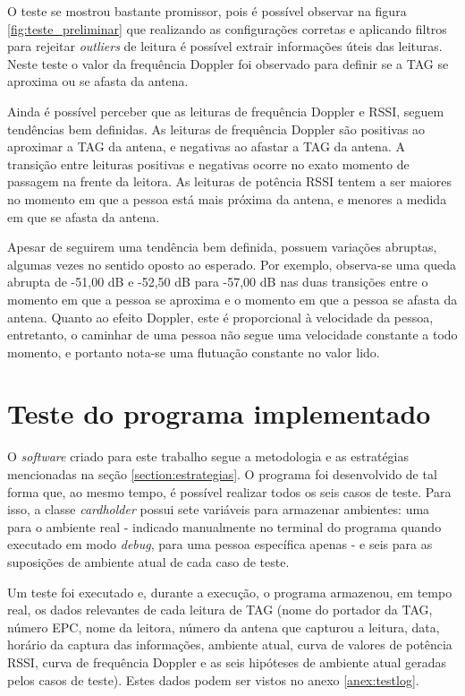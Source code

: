  O teste se mostrou bastante promissor, pois é possível observar na figura \ref{fig:teste_preliminar} que realizando as configurações corretas e aplicando filtros para rejeitar \textit{outliers} de leitura é possível extrair informações úteis das leituras. Neste teste o valor da frequência Doppler foi observado para definir se a TAG se aproxima ou se afasta da antena.
 
 Ainda é possível perceber que as leituras de frequência Doppler e RSSI, seguem tendências bem definidas. As leituras de frequência Doppler são positivas ao aproximar a TAG da antena, e negativas ao afastar a TAG da antena. A transição entre leituras positivas e negativas ocorre no exato momento de passagem na frente da leitora. As leituras de potência RSSI tentem a ser maiores no momento em que a pessoa está mais próxima da antena, e menores a medida em que se afasta da antena.
 
 Apesar de seguirem uma tendência bem definida, possuem variações abruptas, algumas vezes no sentido oposto ao esperado. Por exemplo, observa-se uma queda abrupta de -51,00 dB e -52,50 dB para -57,00 dB nas duas transições entre o momento em que a pessoa se aproxima e o momento em que a pessoa se afasta da antena. Quanto ao efeito Doppler, este é proporcional à velocidade da pessoa, entretanto, o caminhar de uma pessoa não segue uma velocidade constante a todo momento, e portanto nota-se uma flutuação constante no valor lido.

\section{Teste do programa implementado}

O \textit{software} criado para este trabalho segue a metodologia e as estratégias mencionadas na seção \ref{section:estrategias}. O programa foi desenvolvido de tal forma que, ao mesmo tempo, é possível realizar todos os seis casos de teste. Para isso, a classe \textit{cardholder} possui sete variáveis para armazenar ambientes: uma para o ambiente real - indicado manualmente no terminal do programa quando executado em modo \textit{debug}, para uma pessoa específica apenas - e seis para as suposições de ambiente atual de cada caso de teste.

Um teste foi executado e, durante a execução, o programa armazenou, em tempo real, os dados relevantes de cada leitura de TAG (nome do portador da TAG, número EPC, nome da leitora, número da antena que capturou a leitura, data, horário da captura das informações, ambiente atual, curva de valores de potência RSSI, curva de frequência Doppler e as seis hipóteses de ambiente atual geradas pelos casos de teste). Estes dados podem ser vistos no anexo \ref{anex:testlog}.

